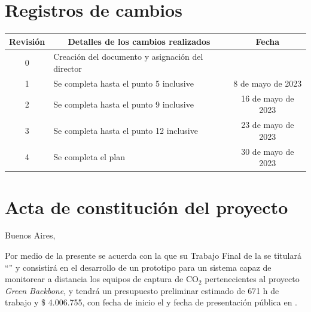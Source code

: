 \documentclass[
11pt, %
]{charter}
\begin{document}
\maketitle
\thispagestyle{empty}
\pagebreak


\thispagestyle{empty}
{\setlength{\parskip}{0pt}
\tableofcontents{}
}
\pagebreak


\section*{Registros de cambios}
\label{sec:registro}


\begin{table}[ht]
\label{tab:registro}
\centering
\begin{tabularx}{\linewidth}{@{}|c|X|c|@{}}
\hline
\rowcolor[HTML]{C0C0C0} 
Revisión & \multicolumn{1}{c|}{\cellcolor[HTML]{C0C0C0}Detalles de los cambios realizados} & Fecha      \\ \hline
0      & Creación del documento y asignación del director		&\fechaInicioName \\ \hline
1      & Se completa hasta el punto 5 inclusive             	& 8 de mayo de 2023 \\ \hline
2      & Se completa hasta el punto 9 inclusive				    & 16 de mayo de 2023 \\ \hline
3      & Se completa hasta el punto 12 inclusive                & 23 de mayo de 2023 \\ \hline
4      & Se completa el plan	                                & 30 de mayo de 2023 \\ \hline
\end{tabularx}
\end{table}

\pagebreak



\section*{Acta de constitución del proyecto}
\label{sec:acta}

\begin{flushright}
Buenos Aires, \fechaInicioName
\end{flushright}

\vspace{1cm}

Por medio de la presente se acuerda con la \authorname\hspace{1px} que su Trabajo Final de la \degreename\hspace{1px} se titulará ``\ttitle'' y consistirá en el desarrollo de un prototipo para un sistema capaz de monitorear a distancia los equipos de captura de CO$_2$ pertenecientes al proyecto \textit{Green Backbone}, y tendrá un presupuesto preliminar estimado de 671 h de trabajo y \$ 4.006.755, con fecha de inicio el \fechaInicioName\hspace{1px} y fecha de presentación pública en \fechaFinalName.
\end{document}
